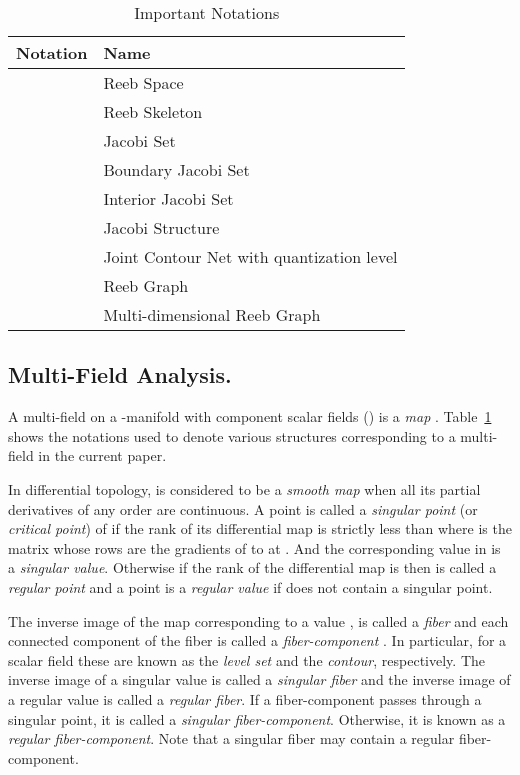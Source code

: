 \documentclass[twocolumn]{article}
\begin{document}
\begin{table}[h!]
 \begin{center}
 \caption{Important Notations}
\begin{tabular}{ll}
\hline
\textbf{Notation}        &  \textbf{Name} \\ 
\hline 
 & 	          Reeb Space\\
 &            Reeb Skeleton\\
  &             Jacobi Set\\
 &             Boundary Jacobi Set\\
  &             Interior Jacobi Set \\
 &             Jacobi Structure\\
 &          Joint Contour Net with quantization
              level \\
 &           Reeb Graph\\
&       Multi-dimensional Reeb Graph\\
\hline
\end{tabular}
\label{tab:notations}
\end{center}
\end{table}

\subsection*{Multi-Field Analysis.}
A multi-field on a -manifold  with  component scalar fields
 () is a \textit{map} . Table~\ref{tab:notations} shows the notations used to denote
various structures corresponding to a multi-field  in the current paper. 


In differential topology,  is considered to be a \textit{smooth map} when all its partial derivatives of any order
are continuous. A point  is called a \textit{singular point} (or
\textit{critical point}) of  if the
rank of its differential map  is strictly less than  where  is the  matrix whose rows are the
gradients of  to  at . And the corresponding
value  in  is a \textit{singular
value}. Otherwise if the rank of the differential map  is  then   is called a \textit{regular point} and a point 
 is a \textit{regular value} if  does not contain
 a singular point. 


The inverse image of the map  corresponding to a
value ,  is called a \textit{fiber}  and each
connected component of the fiber is called a \emph{fiber-component}
\cite{Saeki2014, 2004-Saeki}. In particular, for a scalar field these are known as
the \emph{level set} and the \emph{contour}, respectively.
The inverse image of a singular value is called a \textit{singular fiber} and the inverse image
of a regular value is called a \textit{regular fiber}. If a
fiber-component passes through a singular point, it is called a \emph{singular
fiber-component}. Otherwise, it is known as a \emph{regular
fiber-component}. Note that a singular fiber may contain a regular fiber-component.
\end{document}
